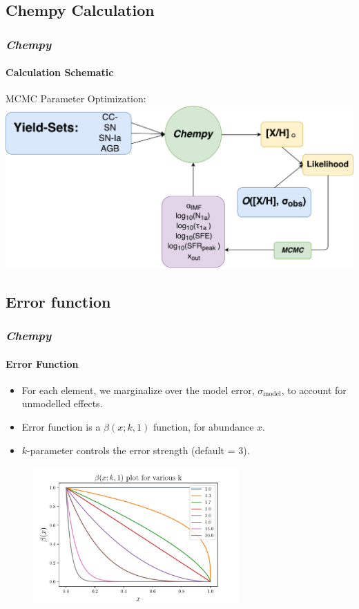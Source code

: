 \documentclass{beamer}
\begin{document}
\subsection{Chempy Calculation}
\begin{frame}
\frametitle{\textit{Chempy}}
\framesubtitle{Calculation Schematic}
MCMC Parameter Optimization:
\hspace{50pt}
\includegraphics[width=\textwidth]{Chempy.pdf}
\end{frame}

\subsection{Error function}
\begin{frame}
\frametitle{\textit{Chempy}}
\framesubtitle{Error Function}
\begin{itemize}
\item For each element, we marginalize over the model error, $\sigma_\mathrm{model}$, to account for unmodelled effects.
\item Error function is a $\beta(x; k,1)$ function, for abundance $x$.
\item $k$-parameter controls the error strength (default = 3).
\end{itemize}
\begin{figure}
\centering
\includegraphics[width=0.7\textwidth]{beta.pdf}
\end{figure}
\end{frame}
\end{document}
